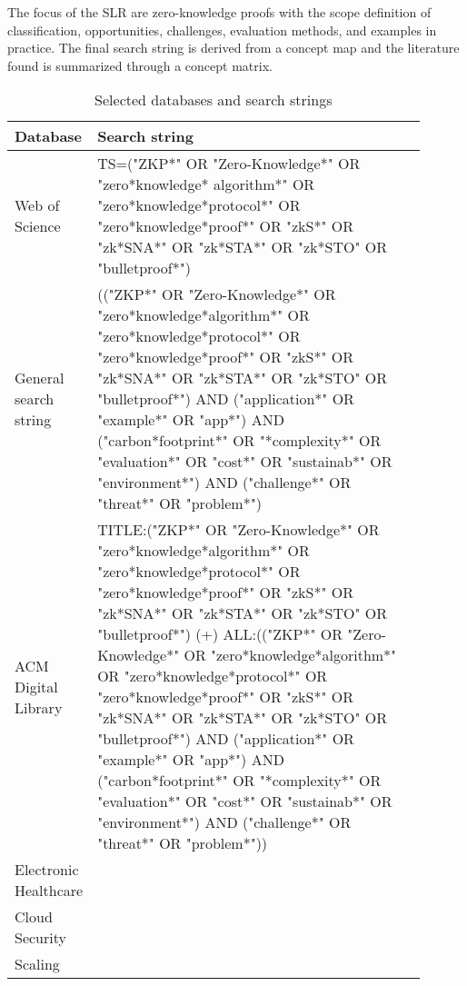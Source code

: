 The focus of the SLR are zero-knowledge proofs with the scope definition of classification, opportunities, challenges, evaluation methods, and examples in practice. The final search string is derived from a concept map and the literature found is summarized through a concept matrix.

\setlength{\tabcolsep}{2ex}
\renewcommand{\arraystretch}{1.5}%
\begin{table}[ht]
	\centering
	    \caption{Selected databases and search strings}
		\begin{tabular}{| m{0.1\linewidth} | m{0.8\linewidth}|}
		\hline
		\textbf{Database} & \textbf{Search string} \\ \hline
            Web of Science & TS=("ZKP*" OR "Zero-Knowledge*" OR "zero*knowledge* algorithm*" OR "zero*knowledge*protocol*" OR "zero*knowledge*proof*" OR "zkS*" OR "zk*SNA*" OR "zk*STA*" OR "zk*STO" OR "bulletproof*") \\  \hline
            General search string & (("ZKP*" OR "Zero-Knowledge*" OR "zero*knowledge*algorithm*" OR "zero*knowledge*protocol*" OR "zero*knowledge*proof*" OR "zkS*" OR "zk*SNA*" OR "zk*STA*" OR "zk*STO" OR "bulletproof*") AND ("application*" OR "example*" OR "app*") AND ("carbon*footprint*" OR "*complexity*" OR "evaluation*" OR "cost*" OR "sustainab*" OR "environment*") 
            AND ("challenge*" OR "threat*" OR "problem*")\\ \hline
            ACM Digital \newline Library & TITLE:("ZKP*" OR "Zero-Knowledge*" OR "zero*knowledge*algorithm*" OR "zero*knowledge*protocol*" OR "zero*knowledge*proof*" OR "zkS*" OR "zk*SNA*" OR "zk*STA*" OR "zk*STO" OR "bulletproof*") \newline
            \newline
            (+) ALL:(("ZKP*" OR "Zero-Knowledge*" OR "zero*knowledge*algorithm*" OR "zero*knowledge*protocol*" OR "zero*knowledge*proof*" OR "zkS*" OR "zk*SNA*" OR "zk*STA*" OR "zk*STO" OR "bulletproof*") AND ("application*" OR "example*" OR "app*") AND ("carbon*footprint*" OR "*complexity*" OR "evaluation*" OR "cost*" OR "sustainab*" OR "environment*") AND ("challenge*" OR "threat*" OR "problem*")) \\ \hline 

            Electronic Healthcare & \citet{LuongPark, ZHENG, WangEtAl, Huangetal} \\  \hline 
            Cloud Security & \citet{LiuWangPengXing, Major, Munivel, Kanagamani} \\  \hline 
            Scaling &  \\  \hline 
	\end{tabular}
\label{tab:domains}
\end{table}
